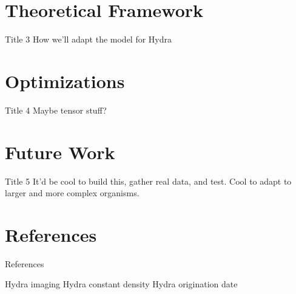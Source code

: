 \documentclass[leqno,presentation,unknownkeysallowed]{beamer}
\newcommand{\hiddensection}[1]{\stepcounter{section}\section*{{#1}}}
\begin{document}
\section{Theoretical Framework}

\begin{frame}{Title 3}
How we'll adapt the model for Hydra
\end{frame}

\section{Optimizations}

\begin{frame}{Title 4}
Maybe tensor stuff?
\end{frame}

\section{Future Work}

\begin{frame}{Title 5}
It'd be cool to build this, gather real data, and test. Cool to adapt to larger and more complex organisms.
\end{frame}

\hiddensection{References}

\begin{frame}{References}
\begin{thebibliography}{10}
 Hydra imaging
 Hydra constant density
 Hydra origination date
\end{thebibliography}
\end{frame}

\end{document}
